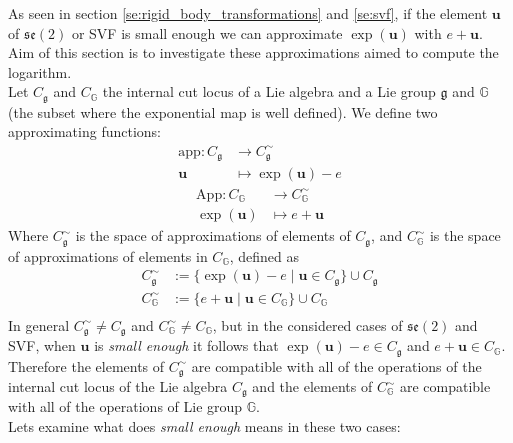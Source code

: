 \noindent
As seen in section \ref{se:rigid_body_transformations} and \ref{se:svf}, if the element $\mathbf{u}$ of $\mathfrak{se}(2)$ or SVF is small enough we can approximate $\exp(\mathbf{u})$ with $e + \mathbf{u}$. Aim of this section is to investigate these approximations aimed to compute the logarithm.  \\
Let $C_\mathfrak{g}$ and $C_\mathbb{G}$ the internal cut locus of a Lie algebra and a Lie group $\mathfrak{g}$ and $\mathbb{G}$ (the subset where the exponential map is well defined).
We define two approximating functions:
\begin{align*}
\text{app} : C_\mathfrak{g} & \longrightarrow  C_\mathfrak{g}^{\sim}    \\
\mathbf{u} &\longmapsto \exp(\mathbf{u}) - e
\end{align*}
\begin{align*}
\text{App} : C_\mathbb{G} & \longrightarrow  C_\mathbb{G}^{\sim}   \\
\exp(\mathbf{u}) &\longmapsto e + \mathbf{u}
\end{align*}
Where $C_\mathfrak{g} ^{\sim}$ is the space of approximations of elements of $C_\mathfrak{g} $, and $C_\mathbb{G}^{\sim} $ is the space of approximations of elements in $C_\mathbb{G}$, defined as
\begin{align*}
C_\mathfrak{g} ^{\sim} & := \{ \exp(\mathbf{u}) - e \mid \mathbf{u}\in C_\mathfrak{g}\} \cup C_\mathfrak{g} \\
C_\mathbb{G}^{\sim}  & := \{ e + \mathbf{u} \mid \mathbf{u}\in C_\mathbb{G}\} \cup C_\mathbb{G} \\
\end{align*}
In general $C_\mathfrak{g}^{\sim} \neq C_\mathfrak{g}$ and $C_\mathbb{G}^{\sim} \neq C_\mathbb{G}$, but in the considered cases of $\mathfrak{se}(2)$ and SVF, when $\mathbf{u}$ is \emph{small enough}
it follows that $\exp(\mathbf{u}) - e \in C_\mathfrak{g} $ and $e + \mathbf{u}\in C_\mathbb{G}$. Therefore the elements of $C_\mathfrak{g}^{\sim} $ are compatible with all of the operations of the internal cut locus of the Lie algebra $C_\mathfrak{g}$ and the elements of $C_\mathbb{G}^{\sim}$ are compatible with all of the operations of Lie group $\mathbb{G}$.\\
Lets examine what does \emph{small enough} means in these two cases:
